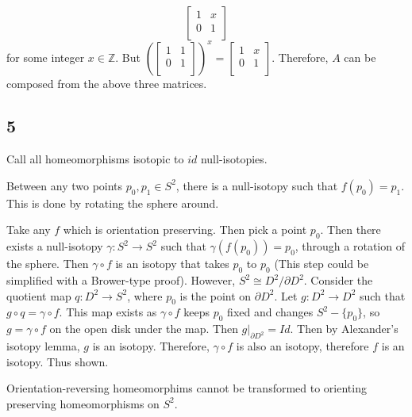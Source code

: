 \documentclass{article}
\theoremstyle{definition}
\numberwithin{theorem}{section}
\numberwithin{equation}{section}
\begin{document}
\begin{equation*}
    \begin{bmatrix}
        1 & x\\
        0 & 1\\
    \end{bmatrix}
\end{equation*}
for some integer $x \in \mathbb{Z}$. But $
\left(\begin{bmatrix}
    1 & 1\\
    0 & 1\\
\end{bmatrix}\right)^x = \begin{bmatrix}
    1 & x\\
    0 & 1\\
\end{bmatrix}$. Therefore, $A$ can be composed from the above three matrices. 

\subsection{5}
Call all homeomorphisms isotopic to $id$ null-isotopies. 

Between any two points $p_0, p_1 \in S^2$, there is a null-isotopy such that $f(p_0) = p_1$. This is done by rotating the sphere around. 

Take any $f$ which is orientation preserving. Then pick a point $p_0$. Then there exists a null-isotopy $\gamma : S^2 \rightarrow S^2$ such that $\gamma(f(p_0)) = p_0$, through a rotation of the sphere. Then $ \gamma \circ f$ is an isotopy that takes $p_0$ to $p_0$ (This step could be simplified with a Brower-type proof). However, $S^2 \cong D^2/{\partial D^2}$. Consider the quotient map $q : D^2 \rightarrow S^2$, where $p_0$ is the point on $\partial D^2$. Let $g : D^2 \rightarrow D^2$ such that $g \circ q = \gamma \circ f$. This map exists as $\gamma \circ f$ keeps $p_0$ fixed and changes $S^2 - \{p_0\}$, so $g = \gamma \circ f$ on the open disk under the map. Then $g|_{\partial D^2} = Id$. Then by Alexander's isotopy lemma, $g$ is an isotopy. Therefore, $\gamma \circ f$ is also an isotopy, therefore $f$ is an isotopy. Thus shown. 

Orientation-reversing homeomorphims cannot be transformed to orienting preserving homeomorphisms on $S^2$. 
\end{document}
